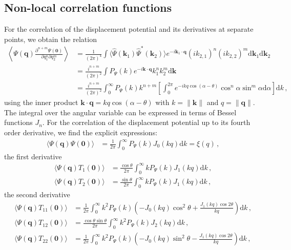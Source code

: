 \documentclass[a4paper, 11pt]{article}
\begin{document}
\subsection{Non-local correlation functions}
For the correlation of the displacement potential and its derivatives at separate points, we obtain the relation
\begin{align}
\left\langle \Psi(\bm{q}) \frac{\partial^{n+m}\Psi(\bm{0})}{\partial q_1^n\partial q_2^m}\right\rangle &=
\frac{1}{(2\pi)^4} \int  \langle \hat{\Psi}(\bm{k}_1)\hat{\Psi}^*(\bm{k}_2)\rangle e^{-i \bm{k}_1 \cdot \bm{q}} (i k_{2,1})^n (i k_{2,2})^m \mathrm{d}\bm{k}_1 \mathrm{d}\bm{k}_2\nonumber\\
&=\frac{i^{n+m}}{(2\pi)^2} \int  P_\Psi(k) e^{-i \bm{k} \cdot \bm{q}} k_{1}^n  k_{2}^m \mathrm{d}\bm{k}\nonumber\\
&=\frac{i^{n+m}}{(2\pi)^2} \int_0^\infty  P_\Psi(k)  k^{n+m} \left[\int_0^{2\pi} e^{-i k q \cos(\alpha-\theta)} \cos^n \alpha \sin^m \alpha \mathrm{d}\alpha\right]\mathrm{d}k\,,
\end{align}
using the inner product $\bm{k}\cdot \bm{q}=k q \cos (\alpha-\theta)$ with $k=\|\bm{k}\|$ and $q=\|\bm{q}\|$. The integral over the angular variable can be expressed in terms of Bessel functions $J_n$. For the correlation of the displacement potential up to its fourth order derivative, we find the explicit expressions:
\begin{align}
\langle \Psi(\bm{q}) \Psi(\bm{0})\rangle &=\frac{1}{2\pi} \int_0^\infty P_{\Psi}(k) J_0(kq)\mathrm{d}k = \xi(q)\,,
\end{align}
the first derivative
\begin{align}
\langle \Psi(\bm{q}) T_1(\bm{0})\rangle &=\frac{\cos\theta}{2\pi} \int_0^\infty k P_{\Psi}(k) J_1(kq) \mathrm{d}k\,,\\
\langle \Psi(\bm{q}) T_2(\bm{0})\rangle &=\frac{\sin\theta}{2\pi} \int_0^\infty k P_{\Psi}(k) J_1(kq) \mathrm{d}k\,,
\end{align}
the second derivative
\begin{align}
\langle \Psi(\bm{q}) T_{11}(\bm{0})\rangle &=\frac{1}{2\pi} \int_0^\infty k^2 P_{\Psi}(k) \left( -J_0(kq)\cos^2\theta +\frac{J_1(kq) \cos 2\theta}{kq}\right)\mathrm{d}k\,,\\
\langle \Psi(\bm{q}) T_{12}(\bm{0})\rangle &=\frac{ \cos \theta \sin \theta}{2\pi} \int_0^\infty k^2 P_{\Psi}(k) J_2(kq)\mathrm{d}k\,,\\
\langle \Psi(\bm{q}) T_{22}(\bm{0})\rangle &=\frac{1}{2\pi} \int_0^\infty k^2 P_{\Psi}(k) \left(  - J_0(kq)\sin^2 \theta -\frac{J_1(kq) \cos 2\theta}{kq}\right)\mathrm{d}k\,,
\end{align}
\end{document}
